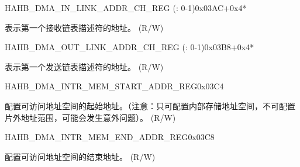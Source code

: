 \begin{register}{H}{AHB\_DMA\_IN\_LINK\_ADDR\_CH\_REG (: 0-1)}{0x03AC+0x4*}\label{regdesc:AHBDMAINLINKADDRCHNREG}
%
\regnewline%
\begin{regdesc}\begin{reglist}
\label{fielddesc:AHBDMAINLINKADDRCHN}\item [AHB\_DMA\_INLINK\_ADDR\_CH\regindex{n}] 表示第一个接收链表描述符的地址。 (R/W)
\end{reglist}\end{regdesc}
\end{register}


\begin{register}{H}{AHB\_DMA\_OUT\_LINK\_ADDR\_CH\_REG (: 0-1)}{0x03B8+0x4*}\label{regdesc:AHBDMAOUTLINKADDRCHNREG}
%
\regnewline%
\begin{regdesc}\begin{reglist}
\label{fielddesc:AHBDMAOUTLINKADDRCHN}\item [AHB\_DMA\_OUTLINK\_ADDR\_CH\regindex{n}] 表示第一个发送链表描述符的地址。 (R/W)
\end{reglist}\end{regdesc}
\end{register}


\begin{register}{H}{AHB\_DMA\_INTR\_MEM\_START\_ADDR\_REG}{0x03C4}\label{regdesc:AHBDMAINTRMEMSTARTADDRREG}
%
\regnewline%
\begin{regdesc}\begin{reglist}
\label{fielddesc:AHBDMAACCESSINTRMEMSTARTADDR}\item [AHB\_DMA\_ACCESS\_INTR\_MEM\_START\_ADDR] 配置可访问地址空间的起始地址。（注意：只可配置内部存储地址空间，不可配置片外地址范围，可能会发生意外问题）。 (R/W)
\end{reglist}\end{regdesc}
\end{register}


\begin{register}{H}{AHB\_DMA\_INTR\_MEM\_END\_ADDR\_REG}{0x03C8}\label{regdesc:AHBDMAINTRMEMENDADDRREG}
%
\regnewline%
\begin{regdesc}\begin{reglist}
\label{fielddesc:AHBDMAACCESSINTRMEMENDADDR}\item [AHB\_DMA\_ACCESS\_INTR\_MEM\_END\_ADDR] 配置可访问地址空间的结束地址。 (R/W)
\end{reglist}\end{regdesc}
\end{register}


